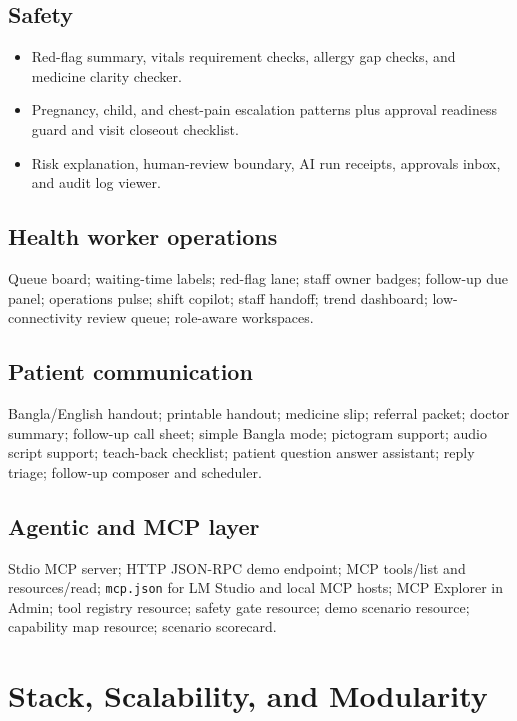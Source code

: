 \documentclass[11pt,letterpaper]{article}
\begin{document}
\subsection{Safety}

\begin{itemize}
  \item Red-flag summary, vitals requirement checks, allergy gap checks, and medicine clarity checker.
  \item Pregnancy, child, and chest-pain escalation patterns plus approval readiness guard and visit closeout checklist.
  \item Risk explanation, human-review boundary, AI run receipts, approvals inbox, and audit log viewer.
\end{itemize}

\subsection{Health worker operations}

Queue board; waiting-time labels; red-flag lane; staff owner badges; follow-up due panel; operations pulse; shift copilot; staff handoff; trend dashboard; low-connectivity review queue; role-aware workspaces.

\subsection{Patient communication}

Bangla/English handout; printable handout; medicine slip; referral packet; doctor summary; follow-up call sheet; simple Bangla mode; pictogram support; audio script support; teach-back checklist; patient question answer assistant; reply triage; follow-up composer and scheduler.

\subsection{Agentic and MCP layer}

Stdio MCP server; HTTP JSON-RPC demo endpoint; MCP tools/list and resources/read; \texttt{mcp.json} for LM Studio and local MCP hosts; MCP Explorer in Admin; tool registry resource; safety gate resource; demo scenario resource; capability map resource; scenario scorecard.

\section{Stack, Scalability, and Modularity}
\end{document}
